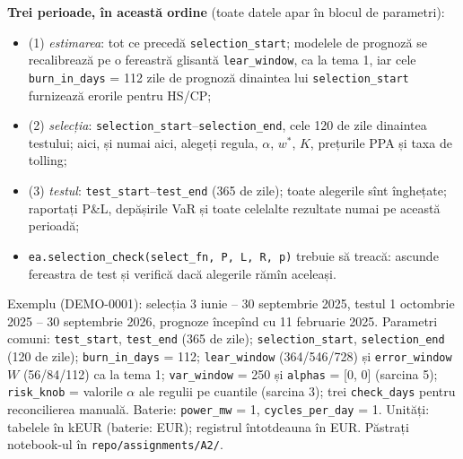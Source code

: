 {\textbf{Trei perioade, în această ordine} (toate datele apar în blocul de parametri):
\begin{itemize}\setlength{\itemsep}{0pt}
\item (1) \emph{estimarea}: tot ce precedă \texttt{selection\_start}; modelele de prognoză se recalibrează pe o fereastră glisantă \texttt{lear\_window}, ca la tema 1, iar cele \texttt{burn\_in\_days} = 112 zile de prognoză dinaintea lui \texttt{selection\_start} furnizează erorile pentru HS/CP;
\item (2) \emph{selecția}: \texttt{selection\_start}--\texttt{selection\_end}, cele 120 de zile dinaintea testului; aici, și numai aici, alegeți regula, $\alpha$, $w^*$, $K$, prețurile PPA și taxa de tolling;
\item (3) \emph{testul}: \texttt{test\_start}--\texttt{test\_end} (365 de zile); toate alegerile sînt înghețate; raportați P\&L, depășirile VaR și toate celelalte rezultate numai pe această perioadă;
\item \texttt{ea.selection\_check(select\_fn, P, L, R, p)} trebuie să treacă: ascunde fereastra de test și verifică dacă alegerile rămîn aceleași.
\end{itemize}
Exemplu (DEMO-0001): selecția 3 iunie -- 30 septembrie 2025, testul 1 octombrie 2025 -- 30 septembrie 2026, prognoze începînd cu 11 februarie 2025.
Parametri comuni: \texttt{test\_start}, \texttt{test\_end} (365 de zile); \texttt{selection\_start}, \texttt{selection\_end} (120 de zile); \texttt{burn\_in\_days} = 112; \texttt{lear\_window} (364/546/728) și \texttt{error\_window} $W$ (56/84/112) ca la tema 1;
\texttt{var\_window} = 250 și \texttt{alphas} = [0, 0] (sarcina 5); \texttt{risk\_knob} = valorile $\alpha$ ale regulii pe cuantile (sarcina 3); trei \texttt{check\_days} pentru reconcilierea manuală. Baterie: \texttt{power\_mw} = 1, \texttt{cycles\_per\_day} = 1.
Unități: tabelele în kEUR (baterie: EUR); registrul întotdeauna în EUR. Păstrați notebook-ul în \texttt{repo/assignments/A2/}.}

